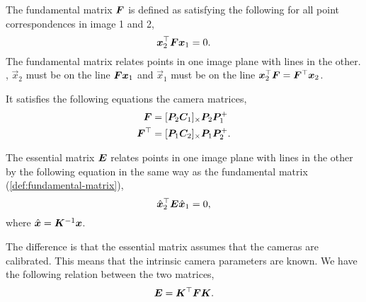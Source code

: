 
\begin{definition}
  \label{def:fundamental-matrix}

  The fundamental matrix $\bm{F}$ is defined as satisfying the following for
  all point correspondences in image 1 and 2, \[
    \bm{x}_2^\top \bm{F} \bm{x}_1 = 0
  .\]
  The fundamental matrix relates points in one image plane with lines in the
  other. \Ie, $\vec{x}_2$ must be on the line $\bm{F} \bm{x}_1$ and
  $\vec{x}_1$ must be on the line $\bm{x}_2^\top \bm{F} =
  \bm{F}^\top \bm{x}_2$.

  It satisfies the following equations \wrt the camera matrices,
  \begin{align*}
    \bm{F} &= [\bm{P}_2 \bm{C}_1]_\times \bm{P}_2 \bm{P}_1^+ \\
    \bm{F}^\top &= [\bm{P}_1 \bm{C}_2]_\times \bm{P}_1 \bm{P}_2^+
  .\end{align*}
\end{definition}

\begin{definition}
  The essential matrix $\bm{E}$ relates points in one image plane with lines
  in the other by the following equation in the same way as the fundamental
  matrix (\cref{def:fundamental-matrix}), \[
    \hat{\bm{x}}_2^\top \bm{E} \hat{\bm{x}}_1 = 0
  ,\]
  where $\hat{\bm{x}} = \bm{K}^{-1} \bm{x}$.

  The difference is that the essential matrix assumes that the cameras are
  calibrated. This means that the intrinsic camera parameters are known. We have
  the following relation between the two matrices, \[
    \bm{E} = \bm{K}^\top \bm{F} \bm{K}
  .\]
\end{definition}

